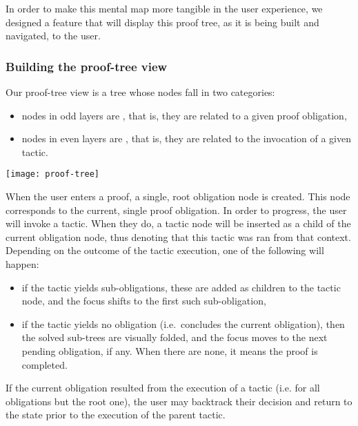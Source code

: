 In order to make this mental map more tangible in the user experience, we
designed a feature that will display this proof tree, as it is being built and
navigated, to the user.

\subsubsection{Building the proof-tree view}

Our proof-tree view is a tree whose nodes fall in two categories:

\begin{itemize}

  \item nodes in odd layers are , that is, they are related to a given proof obligation,

  \item nodes in even layers are , that is, they are related to the invocation of a given tactic.

\end{itemize}

\texttt{[image: proof-tree]}{\parfillskip=0pt\par}

When the user enters a proof, a single, root obligation node is created.  This
node corresponds to the current, single proof obligation.  In order to progress,
the user will invoke a tactic.  When they do, a tactic node will be inserted as
a child of the current obligation node, thus denoting that this tactic was ran
from that context.  Depending on the outcome of the tactic execution, one of the
following will happen:

\begin{itemize}

  \item if the tactic yields sub-obligations, these are added as children to the
tactic node, and the focus shifts to the first such sub-obligation,

  \item if the tactic yields no obligation (i.e.\ concludes the current
obligation), then the solved sub-trees are visually folded, and the focus moves
to the next pending obligation, if any.  When there are none, it means the proof
is completed.

\end{itemize}

If the current obligation resulted from the execution of a tactic (i.e. for all
obligations but the root one), the user may backtrack their decision and return
to the state prior to the execution of the parent tactic.
